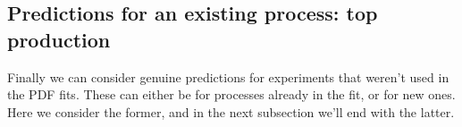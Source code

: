 \subsection{Predictions for an existing process: top production}
\label{subsec:topnhiggs}
Finally we can consider genuine predictions for experiments that weren't used in the PDF fits. These can either be for processes already in the fit, or for new ones. Here we consider the former, and in the next subsection we'll end with the latter.
\begin{figure}[H]
    \begin{center}
    \end{center}

\end{figure}
